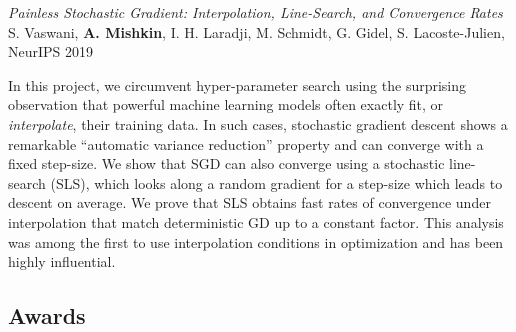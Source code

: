 \begin{description}[leftmargin=\mleftsize,style=nextline,font=\normalfont\space]
    \textit{Painless Stochastic Gradient: Interpolation, Line-Search, and
        Convergence Rates} \\
    S. Vaswani, {\bf A. Mishkin}, I. H. Laradji, M. Schmidt, G. Gidel, S. Lacoste-Julien,
    NeurIPS 2019

    In this project, we circumvent hyper-parameter search
    using the surprising observation that powerful machine learning models often
    exactly fit, or \emph{interpolate}, their training data.
    In such cases, stochastic gradient descent shows a remarkable ``automatic
    variance reduction'' property and can converge with a fixed step-size.
    We show that SGD can also converge using a stochastic
    line-search (SLS), which looks along a random gradient for a
    step-size which leads to descent on average.
    We prove that SLS obtains fast rates of convergence under interpolation
    that match deterministic GD up to a constant factor.
    This analysis was among the first to use interpolation conditions in
    optimization and has been highly influential.

\end{description}

\vspace{2ex}
\subsection{Awards}

